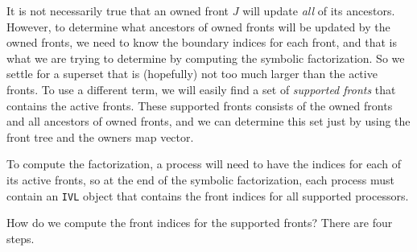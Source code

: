 \par
It is not necessarily true that an owned front $J$ will update 
{\it all} of its ancestors.
However, to determine what ancestors of owned fronts will be updated 
by the owned fronts, we need to know the boundary indices for each
front, and that is what we are trying to determine by computing the
symbolic factorization.
So we settle for a superset that is (hopefully) not too much larger
than the active fronts.
To use a different term, we will easily find a set of 
{\it supported fronts} that contains the active fronts.
These supported fronts consists of the owned fronts and all
ancestors of owned fronts, and we can determine this set just by
using the front tree and the owners map vector.
\par
To compute the factorization, a process will need to have the
indices for each of its active fronts, so at the end of the
symbolic factorization, each process must contain an {\tt IVL}
object that contains the front indices for all supported
processors.
\par
How do we compute the front indices for the supported fronts?
There are four steps.
